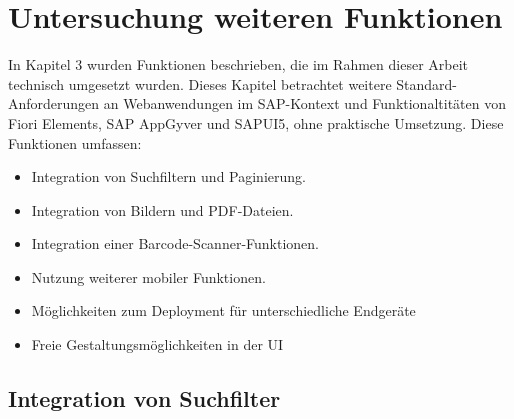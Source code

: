 
\chapter{Untersuchung weiteren Funktionen} \label{UF}

In Kapitel 3 wurden Funktionen beschrieben, die im Rahmen dieser Arbeit technisch umgesetzt wurden. Dieses Kapitel betrachtet weitere Standard-Anforderungen  an Webanwendungen im SAP-Kontext und Funktionaltitäten von Fiori Elements, SAP AppGyver und SAPUI5, ohne praktische Umsetzung. Diese Funktionen umfassen: 

\begin{itemize}[noitemsep]
\item Integration von Suchfiltern und Paginierung. 
\item Integration von Bildern und PDF-Dateien.
\item Integration einer Barcode-Scanner-Funktionen.
\item Nutzung weiterer mobiler Funktionen. 
\item Möglichkeiten zum Deployment für unterschiedliche Endgeräte
\item Freie Gestaltungsmöglichkeiten in der UI
\end{itemize}

\section{Integration von Suchfilter}

